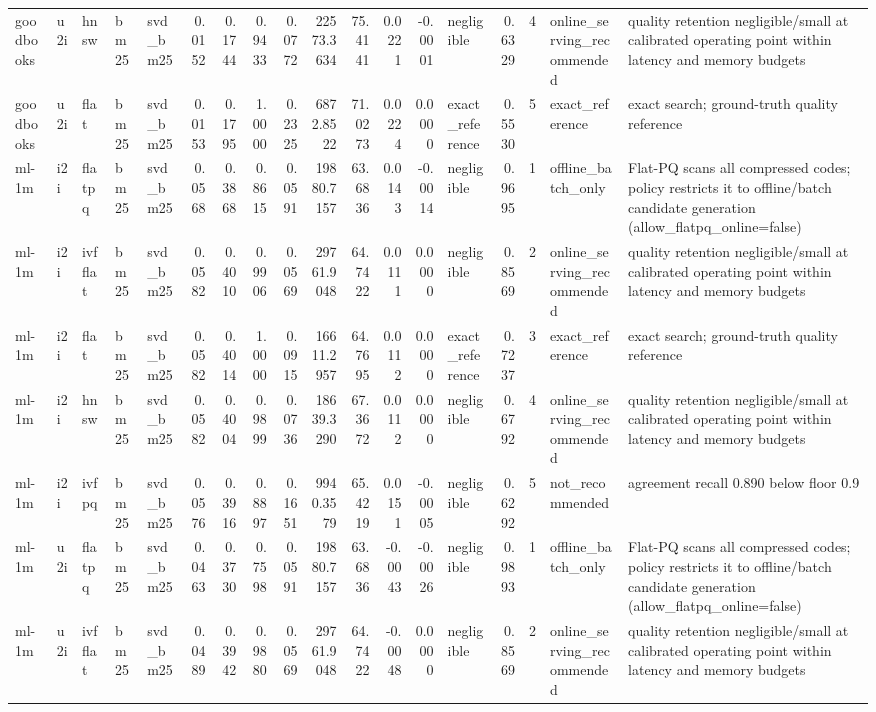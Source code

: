 \begin{tabular}{lllllrrrrrrrrlrrll}
goodbooks & u2i & hnsw & bm25 & svd_bm25 & 0.0152 & 0.1744 & 0.9433 & 0.0772 & 22573.3634 & 75.4141 & 0.0221 & -0.0001 & negligible & 0.6329 & 4 & online_serving_recommended & quality retention negligible/small at calibrated operating point within latency and memory budgets \\
goodbooks & u2i & flat & bm25 & svd_bm25 & 0.0153 & 0.1795 & 1.0000 & 0.2325 & 6872.8522 & 71.0273 & 0.0224 & 0.0000 & exact_reference & 0.5530 & 5 & exact_reference & exact search; ground-truth quality reference \\
ml-1m & i2i & flatpq & bm25 & svd_bm25 & 0.0568 & 0.3868 & 0.8615 & 0.0591 & 19880.7157 & 63.6836 & 0.0143 & -0.0014 & negligible & 0.9695 & 1 & offline_batch_only & Flat-PQ scans all compressed codes; policy restricts it to offline/batch candidate generation (allow_flatpq_online=false) \\
ml-1m & i2i & ivfflat & bm25 & svd_bm25 & 0.0582 & 0.4010 & 0.9906 & 0.0569 & 29761.9048 & 64.7422 & 0.0111 & 0.0000 & negligible & 0.8569 & 2 & online_serving_recommended & quality retention negligible/small at calibrated operating point within latency and memory budgets \\
ml-1m & i2i & flat & bm25 & svd_bm25 & 0.0582 & 0.4014 & 1.0000 & 0.0915 & 16611.2957 & 64.7695 & 0.0112 & 0.0000 & exact_reference & 0.7237 & 3 & exact_reference & exact search; ground-truth quality reference \\
ml-1m & i2i & hnsw & bm25 & svd_bm25 & 0.0582 & 0.4004 & 0.9899 & 0.0736 & 18639.3290 & 67.3672 & 0.0112 & 0.0000 & negligible & 0.6792 & 4 & online_serving_recommended & quality retention negligible/small at calibrated operating point within latency and memory budgets \\
ml-1m & i2i & ivfpq & bm25 & svd_bm25 & 0.0576 & 0.3916 & 0.8897 & 0.1651 & 9940.3579 & 65.4219 & 0.0151 & -0.0005 & negligible & 0.6292 & 5 & not_recommended & agreement recall 0.890 below floor 0.9 \\
ml-1m & u2i & flatpq & bm25 & svd_bm25 & 0.0463 & 0.3730 & 0.7598 & 0.0591 & 19880.7157 & 63.6836 & -0.0043 & -0.0026 & negligible & 0.9893 & 1 & offline_batch_only & Flat-PQ scans all compressed codes; policy restricts it to offline/batch candidate generation (allow_flatpq_online=false) \\
ml-1m & u2i & ivfflat & bm25 & svd_bm25 & 0.0489 & 0.3942 & 0.9880 & 0.0569 & 29761.9048 & 64.7422 & -0.0048 & 0.0000 & negligible & 0.8569 & 2 & online_serving_recommended & quality retention negligible/small at calibrated operating point within latency and memory budgets \\

\end{tabular}
